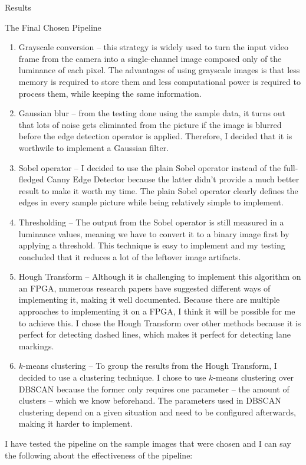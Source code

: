 \documentclass{matthijs}
\begin{document}
\begin{hoofdstuk}{Results}
\begin{paragraaf}{The Final Chosen Pipeline}
\begin{enumerate}
				\item	Grayscale conversion -- this strategy is widely used to turn the input video frame from the camera into a single-channel image composed only of the luminance of each pixel.
					The advantages of using grayscale images is that less memory is required to store them and less computational power is required to process them, while keeping the same information.
				\item	Gaussian blur -- from the testing done using the sample data, it turns out that lots of noise gets eliminated from the picture if the image is blurred before the edge detection operator is applied.
					Therefore, I decided that it is worthwile to implement a Gaussian filter.
				\item	Sobel operator -- I decided to use the plain Sobel operator instead of the full-fledged Canny Edge Detector because the latter didn't provide a much better result to make it worth my time.
					The plain Sobel operator clearly defines the edges in every sample picture while being relatively simple to implement.
				\item	Thresholding -- The output from the Sobel operator is still measured in a luminance values, meaning we have to convert it to a binary image first by applying a threshold.
					This technique is easy to implement and my testing concluded that it reduces a lot of the leftover image artifacts.
				\item	Hough Transform -- Although it is challenging to implement this algorithm on an FPGA, numerous research papers have suggested different ways of implementing it, making it well documented.
					Because there are multiple approaches to implementing it on a FPGA, I think it will be possible for me to achieve this.
					I chose the Hough Transform over other methods because it is perfect for detecting dashed lines, which makes it perfect for detecting lane markings.
				\item	$k$-means clustering -- To group the results from the Hough Transform, I decided to use a clustering technique.
					I chose to use $k$-means clustering over DBSCAN because the former only requires one parameter -- the amount of clusters -- which we know beforehand.
					The parameters used in DBSCAN clustering depend on a given situation and need to be configured afterwards, making it harder to implement.

			\end{enumerate}

			I have tested the pipeline on the sample images that were chosen and I can say the following about the effectiveness of the pipeline:


\end{paragraaf}
\end{hoofdstuk}
\end{document}
